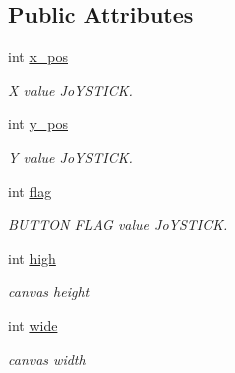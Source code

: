 \subsection*{Public Attributes}
\begin{DoxyCompactItemize}
\item 
\hypertarget{class_c_sketch_aeb65a29363787d35bbfd765c049a7d63}{}\label{class_c_sketch_aeb65a29363787d35bbfd765c049a7d63} 
int \hyperlink{class_c_sketch_aeb65a29363787d35bbfd765c049a7d63}{x\+\_\+pos}
\begin{DoxyCompactList}\small\item\em X value Jo\+Y\+S\+T\+I\+CK. \end{DoxyCompactList}\item 
\hypertarget{class_c_sketch_a8fadff8eac2e751ed8f6f585ad8cdbcb}{}\label{class_c_sketch_a8fadff8eac2e751ed8f6f585ad8cdbcb} 
int \hyperlink{class_c_sketch_a8fadff8eac2e751ed8f6f585ad8cdbcb}{y\+\_\+pos}
\begin{DoxyCompactList}\small\item\em Y value Jo\+Y\+S\+T\+I\+CK. \end{DoxyCompactList}\item 
\hypertarget{class_c_sketch_a7af78eab75ed32e99ab8d0cf4eeae35e}{}\label{class_c_sketch_a7af78eab75ed32e99ab8d0cf4eeae35e} 
int \hyperlink{class_c_sketch_a7af78eab75ed32e99ab8d0cf4eeae35e}{flag}
\begin{DoxyCompactList}\small\item\em B\+U\+T\+T\+ON F\+L\+AG value Jo\+Y\+S\+T\+I\+CK. \end{DoxyCompactList}\item 
\hypertarget{class_c_sketch_a81539cd9ecc9bac8ee7ae0d1a31a05ad}{}\label{class_c_sketch_a81539cd9ecc9bac8ee7ae0d1a31a05ad} 
int \hyperlink{class_c_sketch_a81539cd9ecc9bac8ee7ae0d1a31a05ad}{high}
\begin{DoxyCompactList}\small\item\em canvas height \end{DoxyCompactList}\item 
\hypertarget{class_c_sketch_a480d1471ba50b8db722ddad680d53fc9}{}\label{class_c_sketch_a480d1471ba50b8db722ddad680d53fc9} 
int \hyperlink{class_c_sketch_a480d1471ba50b8db722ddad680d53fc9}{wide}
\begin{DoxyCompactList}\small\item\em canvas width \end{DoxyCompactList}\item 
\hypertarget{class_c_sketch_a137fb639e3a0b37951be649bf6beeadf}{}\label{class_c_sketch_a137fb639e3a0b37951be649bf6beeadf} 

\end{DoxyCompactItemize}
